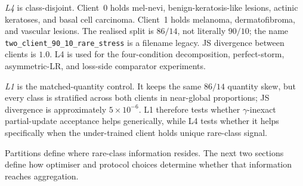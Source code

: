 \documentclass[11pt,a4paper]{report}
\begin{document}
\emph{L4} is class-disjoint. Client~0 holds mel-nevi,
benign-keratosis-like lesions, actinic keratoses, and basal cell carcinoma.
Client~1 holds melanoma, dermatofibroma, and vascular lesions. The realised
split is $86/14$, not literally $90/10$; the name
\texttt{two\_client\_90\_10\_rare\_stress} is a filename legacy. JS divergence
between clients is $1.0$. L4 is used for the four-condition decomposition,
perfect-storm, asymmetric-LR, and loss-side comparator experiments.

\emph{L1} is the matched-quantity control. It keeps the same $86/14$
quantity skew, but every class is stratified across both clients in
near-global proportions; JS divergence is approximately $5 \times 10^{-6}$.
L1 therefore tests whether $\gamma$-inexact partial-update acceptance helps
generically, while L4 tests whether it helps specifically when the
under-trained client holds unique rare-class signal.

Partitions define where rare-class information resides. The next two
sections define how optimiser and protocol choices determine whether that
information reaches aggregation.
\end{document}
